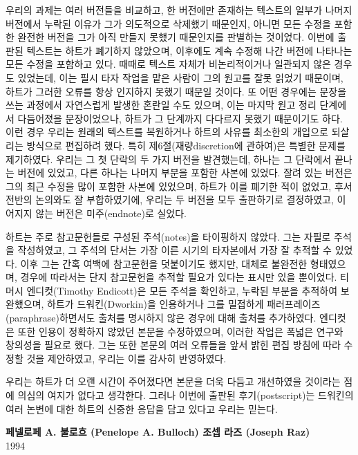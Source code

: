 \documentclass[12pt, oneside]{book}  %
\begin{document}
우리의 과제는 여러 버전들을 비교하고, 한 버전에만 존재하는 텍스트의
일부가 나머지 버전에서 누락된 이유가 그가 의도적으로 삭제했기 때문인지,
아니면 모든 수정을 포함한 완전한 버전을 그가 아직 만들지 못했기
때문인지를 판별하는 것이었다. 이번에 출판된 텍스트는 하트가 폐기하지
않았으며, 이후에도 계속 수정해 나간 버전에 나타나는 모든 수정을 포함하고
있다. 때때로 텍스트 자체가 비논리적이거나 일관되지 않은 경우도 있었는데,
이는 필시 타자 작업을 맡은 사람이 그의 원고를 잘못 읽었기 때문이며,
하트가 그러한 오류를 항상 인지하지 못했기 때문일 것이다. 또 어떤
경우에는 문장을 쓰는 과정에서 자연스럽게 발생한 혼란일 수도 있으며, 이는
마지막 원고 정리 단계에서 다듬어졌을 문장이었으나, 하트가 그 단계까지
다다르지 못했기 때문이기도 하다. 이런 경우 우리는 원래의 텍스트를
복원하거나 하트의 사유를 최소한의 개입으로 되살리는 방식으로 편집하려
했다. 특히 제6절(재량discretion에 관하여)은 특별한 문제를 제기하였다.
우리는 그 첫 단락의 두 가지 버전을 발견했는데, 하나는 그 단락에서 끝나는
버전에 있었고, 다른 하나는 나머지 부분을 포함한 사본에 있었다. 잘려 있는
버전은 그의 최근 수정을 많이 포함한 사본에 있었으며, 하트가 이를 폐기한
적이 없었고, 후서 전반의 논의와도 잘 부합하였기에, 우리는 두 버전을 모두
출판하기로 결정하였고, 이어지지 않는 버전은 미주(endnote)로 실었다.

하트는 주로 참고문헌들로 구성된 주석(notes)을 타이핑하지 않았다. 그는
자필로 주석을 작성하였고, 그 주석의 단서는 가장 이른 시기의 타자본에서
가장 잘 추적할 수 있었다. 이후 그는 간혹 여백에 참고문헌을 덧붙이기도
했지만, 대체로 불완전한 형태였으며, 경우에 따라서는 단지 참고문헌을
추적할 필요가 있다는 표시만 있을 뿐이었다. 티머시 엔디컷(Timothy
Endicott)은 모든 주석을 확인하고, 누락된 부분을 추적하여 보완했으며,
하트가 드워킨(Dworkin)을 인용하거나 그를 밀접하게
패러프레이즈(paraphrase)하면서도 출처를 명시하지 않은 경우에 대해 출처를
추가하였다. 엔디컷은 또한 인용이 정확하지 않았던 본문을 수정하였으며,
이러한 작업은 폭넓은 연구와 창의성을 필요로 했다. 그는 또한 본문의 여러
오류들을 앞서 밝힌 편집 방침에 따라 수정할 것을 제안하였고, 우리는 이를
감사히 반영하였다.

우리는 하트가 더 오랜 시간이 주어졌다면 본문을 더욱 다듬고 개선하였을
것이라는 점에 의심의 여지가 없다고 생각한다. 그러나 이번에 출판된
후기(postscript)는 드워킨의 여러 논변에 대한 하트의 신중한 응답을 담고
있다고 우리는 믿는다.

\vspace{1em}

\begin{flushright}
\textbf{페넬로페 A. 불로흐 (Penelope A. Bulloch) 조셉 라즈 (Joseph Raz)}
\\ 1994
\end{flushright}
\end{document}
